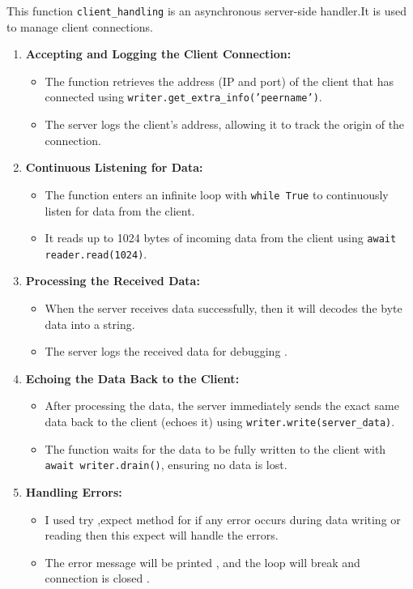 \documentclass{exam}
\begin{document}
This function \texttt{client\_handling} is an asynchronous server-side handler.It is used to manage client connections. 
\begin{enumerate}
    \item \textbf{Accepting and Logging the Client Connection:}
    \begin{itemize}
        \item The function retrieves the address (IP and port) of the client that has connected using \texttt{writer.get\_extra\_info('peername')}.
        \item The server logs the client's address, allowing it to track the origin of the connection.
    \end{itemize}
    
    \item \textbf{Continuous Listening for Data:}
    \begin{itemize}
        \item The function enters an infinite loop with \texttt{while True} to continuously listen for data from the client.
        \item It reads up to 1024 bytes of incoming data from the client using \texttt{await reader.read(1024)}.
    \end{itemize}
    
    \item \textbf{Processing the Received Data:}
    \begin{itemize}
        \item When the server  receives data successfully, then it will decodes the byte data into a string.
        \item The server logs the received data for debugging .
    \end{itemize}
    
    \item \textbf{Echoing the Data Back to the Client:}
    \begin{itemize}
        \item After processing the data, the server immediately sends the exact same data back to the client (echoes it) using \texttt{writer.write(server\_data)}.
        \item The function waits for the data to be fully written to the client with \texttt{await writer.drain()}, ensuring no data is lost.
    \end{itemize}
    
    \item \textbf{Handling Errors:}
    \begin{itemize}
        \item 
        I used try ,expect method for if any error occurs during data writing or reading then this expect will handle the errors. 
        \item The error message will be printed , and the  loop will break and connection is closed .
    \end{itemize}
    

\end{enumerate}
\end{document}
